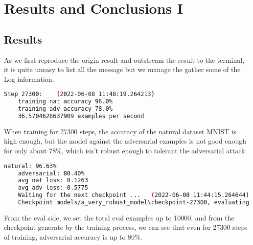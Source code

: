 \documentclass[
	letterpaper, %
	10pt, %
]{CSUniSchoolLabReport}
\begin{document}
\section{Results and Conclusions I}
\subsection{Results}
As we first reproduce the origin result and outstream the result to the terminal, it is quite uneasy to list all the message but we manage the gather some of the Log information. 

\begin{lstlisting}[language=bash]
	Step 27300:    (2022-06-08 11:48:19.264213)
	training nat accuracy 96.0%
	training adv accuracy 78.0%
	36.5704628637909 examples per second
\end{lstlisting}
When training for 27300 steps, the accuracy of the natural dataset MNIST is high enough, but the model against the adversarial examples is not good enough for only about 78\%, which isn't robust enough to tolerant the adversarial attack.
\begin{lstlisting}[language=bash]
	natural: 96.63%
	adversarial: 80.40%
	avg nat loss: 0.1263
	avg adv loss: 0.5775
	Waiting for the next checkpoint ...   (2022-06-08 11:44:15.264644)   ........................       
	Checkpoint models/a_very_robust_model\checkpoint-27300, evaluating ...   (2022-06-08 11:48:25.721207)
\end{lstlisting}
From the eval side, we set the total eval examples up to 10000, and from the checkpoint generate by the training process, we can see that even for 27300 steps of training, adversarial accuracy is up to 80\%.
\end{document}
